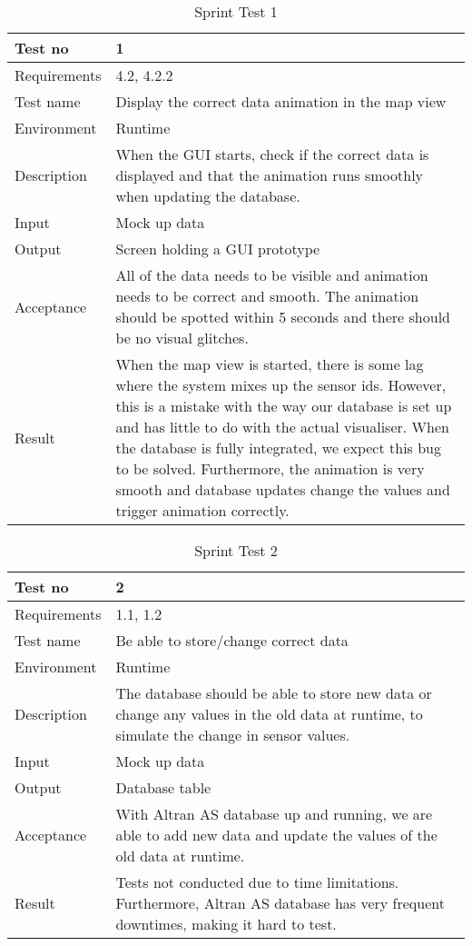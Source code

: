 \documentclass[../document]{subfiles}
\begin{document}
\begin{table}[H]
\caption{Sprint Test 1}
\centering
\begin{tabularx}{\textwidth}{|l|X|}
\hline
Test no
&1
\\ \hline Requirements
&4.2, 4.2.2
\\ \hline Test name
&Display the correct data animation in the map view
\\ \hline Environment
&Runtime
\\ \hline Description
&When the GUI starts, check if the correct data is displayed and that the animation runs smoothly when updating the database.
\\ \hline Input
&Mock up data
\\ \hline Output
&Screen holding a GUI prototype
\\ \hline Acceptance
&All of the data needs to be visible and animation needs to be correct and smooth. The animation should be spotted within 5 seconds and there should be no visual glitches.
\\ \hline Result
&When the map view is started, there is some lag where the system mixes up the sensor ids. However, this is a mistake with the way our database is set up and has little to do with the actual visualiser. When the database is fully integrated, we expect this bug to be solved. Furthermore, the animation is very smooth and database updates change the values and trigger animation correctly.
\\ \hline 
\end{tabularx}
\end{table}

\begin{table}[H]
\caption{Sprint Test 2}
\centering
\begin{tabularx}{\textwidth}{|l|X|}
\hline
Test no
&2
\\ \hline Requirements
&1.1, 1.2
\\ \hline Test name
&Be able to store/change correct data
\\ \hline Environment
&Runtime
\\ \hline Description
&The database should be able to store new data or change any values in the old data at runtime, to simulate the change in sensor values.
\\ \hline Input
&Mock up data
\\ \hline Output
&Database table
\\ \hline Acceptance
&With \gls{Altran} AS database up and running, we are able to add new data and update the values of the old data at runtime.
\\ \hline Result
&Tests not conducted due to time limitations. Furthermore, \gls{Altran} AS database has very frequent downtimes, making it hard to test.
\\ \hline 
\end{tabularx}
\end{table}
\end{document}
